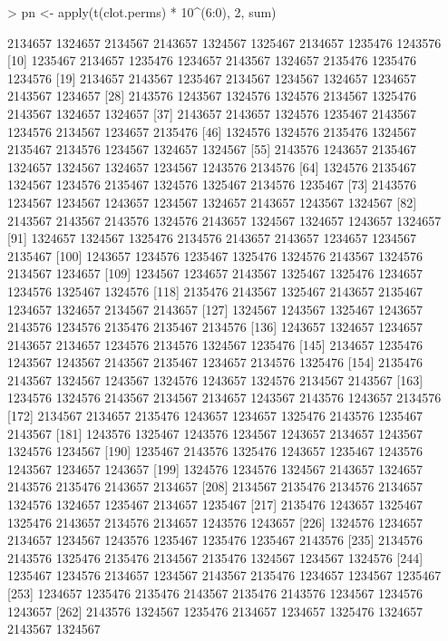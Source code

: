 \documentclass{scrartcl}
\begin{document}
\begin{Schunk}
\begin{Sinput}
> pn <- apply(t(clot.perms) * 10^(6:0), 2, sum)
\end{Sinput}
\begin{Soutput}
   [1] 2134657 1324657 2134567 2143657 1324567 1325467 2134657 1235476 1243576
  [10] 1235467 2134657 1235476 1234657 2143567 1324657 2135476 1235476 1234576
  [19] 2134657 2143567 1235467 2134567 1234567 1324657 1234657 2143567 1234657
  [28] 2143576 1243567 1324576 1324576 2134567 1325476 2143567 1324657 1324657
  [37] 2143657 2143657 1324576 1235467 2143567 1234576 2134567 1234657 2135476
  [46] 1324576 1324576 2135476 1324567 2135467 2134576 1234567 1324657 1324567
  [55] 2143576 1243657 2135467 1324657 1324567 1324657 1234567 1243576 2134576
  [64] 1324576 2135467 1324567 1234576 2135467 1324576 1325467 2134576 1235467
  [73] 2143576 1234567 1234567 1243657 1234567 1324657 2143657 1243567 1324567
  [82] 2143567 2143567 2143576 1324576 2143657 1324567 1324657 1243657 1324657
  [91] 1324657 1324567 1325476 2134576 2143657 2143657 1234657 1234567 2135467
 [100] 1243657 1234576 1235467 1325476 1324576 2143567 1324576 2134567 1234657
 [109] 1234567 1234657 2143567 1325467 1325476 1234657 1234576 1325467 1324576
 [118] 2135476 2143567 1325467 2143657 2135467 1234657 1324657 2134567 2143657
 [127] 1324567 1243567 1325467 1243657 2143576 1234576 2135476 2135467 2134576
 [136] 1243657 1324657 1234657 2143657 2134657 1234576 2134576 1324567 1235476
 [145] 2134657 1235476 1243567 1243567 2143567 2135467 1234657 2134576 1325476
 [154] 2135476 2143567 1324567 1243567 1324576 1243657 1324576 2134567 2143567
 [163] 1234576 1324576 2143567 2134567 2134657 1243567 2143576 1243657 2134576
 [172] 2134567 2134657 2135476 1243657 1234657 1325476 2143576 1235467 2143567
 [181] 1243576 1325467 1243576 1234567 1243657 2134657 1243567 1324576 1234567
 [190] 1235467 2143576 1325476 1243657 1235467 1243576 1243567 1234657 1243657
 [199] 1324576 1234576 1324567 2143657 1324657 2143576 2135476 2143657 2134657
 [208] 2134567 2135476 2134576 2134657 1324576 1324657 1235467 2134657 1235467
 [217] 2135476 1243657 1325467 1325476 2143657 2134576 2134657 1243576 1243657
 [226] 1324576 1234657 2134657 1234567 1243576 1235467 1235476 1235467 2143576
 [235] 2134576 2143576 1325476 2135476 2134567 2135476 1324567 1234567 1324576
 [244] 1235467 1234576 2134657 1234567 2143567 2135476 1234657 1234567 1235467
 [253] 1234657 1235476 2135476 2143567 2135476 2143576 1234567 1234576 1243657
 [262] 2143576 1324567 1235476 2134657 1234657 1325476 1324657 2143567 1324567

\end{Soutput}
\end{Schunk}
\end{document}

